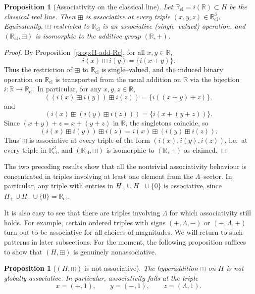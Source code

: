 \documentclass[11pt]{amsart}
\numberwithin{equation}{section}
\newtheorem{proposition}[theorem]{Proposition}
\theoremstyle{definition}
\theoremstyle{remark}
\newcommand{\R}{\mathbb{R}}
\newcommand{\Rc}{\mathbb{R}_{\mathrm{cl}}} %
\newcommand{\Hnum}{H}                      %
\newcommand{\op}{\boxplus}                 %
\newcommand{\iemb}{i}                      %
\begin{document}
\begin{proposition}[Associativity on the classical line]
\label{prop:assoc-Rc}
Let $\Rc=\iemb(\R)\subset\Hnum$ be the classical real line.  Then
$\op$ is associative at every triple $(x,y,z)\in\Rc^3$.  Equivalently,
$\op$ restricted to $\Rc$ is an associative (single–valued) operation,
and $(\Rc,\op)$ is isomorphic to the additive group $(\R,+)$.
\end{proposition}

\begin{proof}
By Proposition~\ref{prop:H-add-Rc}, for all $x,y\in\R$,
\[
  \iemb(x)\op\iemb(y) = \{\iemb(x+y)\}.
\]
Thus the restriction of $\op$ to $\Rc$ is single–valued, and the
induced binary operation on $\Rc$ is transported from the usual
addition on $\R$ via the bijection $\iemb:\R\to\Rc$.  In particular,
for any $x,y,z\in\R$,
\[
  ((\iemb(x)\op\iemb(y))\op\iemb(z))
  = \{ \iemb((x+y)+z) \},
\]
and
\[
  (\iemb(x)\op(\iemb(y)\op\iemb(z)))
  = \{ \iemb(x+(y+z)) \}.
\]
Since $(x+y)+z=x+(y+z)$ in $\R$, the singletons coincide, so
\[
  (\iemb(x)\op\iemb(y))\op\iemb(z)
  = \iemb(x)\op(\iemb(y)\op\iemb(z)).
\]
Thus $\op$ is associative at every triple of the form
$(\iemb(x),\iemb(y),\iemb(z))$, i.e.\ at every triple in $\Rc^3$, and
$(\Rc,\op)$ is isomorphic to $(\R,+)$ as claimed.
\end{proof}

The two preceding results show that all the nontrivial associativity
behaviour is concentrated in triples involving at least one element
from the $\Lambda$–sector.  In particular, any triple with entries in
$H_+\cup H_-\cup\{0\}$ is associative, since $H_+\cup H_-\cup\{0\}
=\Rc$.

It is also easy to see that there are triples involving $\Lambda$ for
which associativity still holds.  For example, certain ordered
triples with signs $(+, \Lambda, -)$ or $(-,\Lambda,+)$ turn out to be
associative for all choices of magnitudes.  We will return to such
patterns in later subsections.  For the moment, the following
proposition suffices to show that $(\Hnum,\op)$ is genuinely
nonassociative.

\begin{proposition}[$(\Hnum,\op)$ is not associative]
\label{prop:H-not-assoc}
The hyperaddition $\op$ on $\Hnum$ is not globally associative.  In
particular, associativity fails at the triple
\[
  x=(+,1),\qquad y=(-,1),\qquad z=(\Lambda,1).
\]
\end{proposition}
\end{document}
